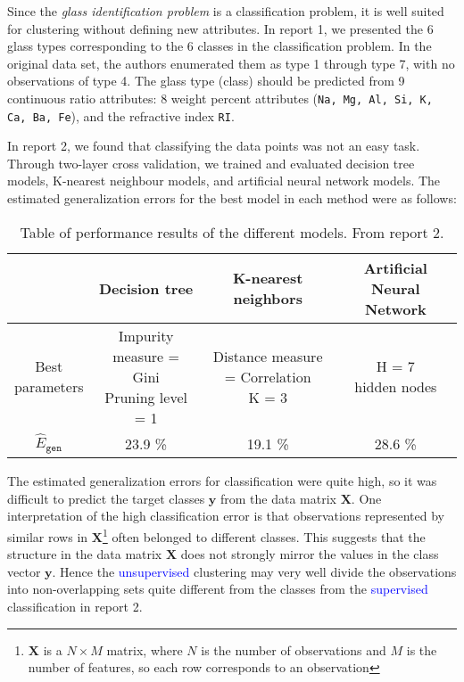 Since the \textcolor{Bittersweet}{\textit{glass identification problem}} is a classification problem, it is well suited for clustering without defining new attributes. In report 1, we presented the 6 glass types corresponding to the 6 classes in the classification problem. In the original data set, the authors enumerated them as type 1 through type 7, with no observations of type 4. The glass type (class) should be predicted from 9 continuous ratio attributes: 8 weight percent attributes (\texttt{Na, Mg, Al, Si, K, Ca, Ba, Fe}), and the refractive index \texttt{RI}.

In report 2, we found that classifying the data points was not an easy task. Through two-layer cross validation, we trained and evaluated decision tree models, K-nearest neighbour models, and artificial neural network models. The estimated generalization errors for the best model in each method were as follows:

\begin{table}[H]
    \centering
    \begin{tabular}{c|c c c}
     & Decision tree & K-nearest neighbors & Artificial Neural Network \\ \hline
    \thead{Best\\parameters}     & \thead{Impurity measure = Gini \\ Pruning level = 1} & \thead{Distance measure = Correlation \\ K = 3} & \thead{H = 7 \\hidden nodes} \\ 
    $\hat{E}_{\texttt{gen}} $     & 23.9 \% & 19.1 \% & 28.6 \%
    \end{tabular}
    \caption{Table of performance results of the different models. From report 2.}
    \label{classification-performance}
\end{table}

\vspace{-0.5 cm}
The estimated generalization errors for classification were quite high, so it was difficult to predict the target classes $\bm{y}$ from the data matrix $\bm{X}$. One interpretation of the high classification error is that observations represented by similar rows in $\bm{X}$\footnote{$\bm{X}$ is a $N \times M$ matrix, where $N$ is the number of observations and $M$ is the number of features, so each row corresponds to an observation} often belonged to different classes. This suggests that the structure in the data matrix $\bm{X}$ does not strongly mirror the values in the class vector $\bm{y}$. Hence the \textcolor{blue}{unsupervised} clustering may very well divide the observations into non-overlapping sets quite different from the classes from the \textcolor{blue}{supervised} classification in report 2.
